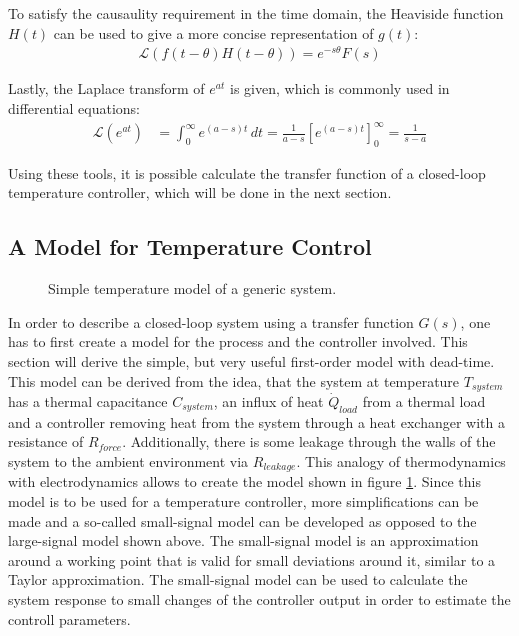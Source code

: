 To satisfy the causaulity requirement in the time domain, the Heaviside function $H(t)$ can be used to give a more concise representation of $g(t)$:
\begin{align}
    \mathscr{L}\left( f(t-\theta) H(t-\theta) \right) = e^{-s\theta} F(s) \label{eqn:laplace_causality}
\end{align}

Lastly, the Laplace transform of $e^{at}$ is given, which is commonly used in differential equations:
\begin{align}
    \mathscr{L}\left(e^{at} \right) &= \int_0^\infty e^{(a-s)t}\,dt = \frac{1}{a-s} \left[e^{(a-s)t} \right]_0^\infty = \frac{1}{s-a} \label{eqn:laplace_exponential}
\end{align}


Using these tools, it is possible calculate the transfer function of a closed-loop temperature controller, which will be done in the next section.

\clearpage
\subsection{A Model for Temperature Control}%
\label{sec:temperature_control_model}
\begin{figure}[ht]
    \centering
    \caption{Simple temperature model of a generic system.}
    \label{fig:first-order_model_room}
\end{figure}

In order to describe a closed-loop system using a transfer function $G(s)$, one has to first create a model for the process and the controller involved. This section will derive the simple, but very useful first-order model with dead-time. This model can be derived from the idea, that the system at temperature $T_{system}$ has a thermal capacitance $C_{system}$, an influx of heat $\dot Q_{load}$ from a thermal load and a controller removing heat from the system through a heat exchanger with a resistance of $R_{force}$. Additionally, there is some leakage through the walls of the system to the ambient environment via $R_{leakage}$. This analogy of thermodynamics with electrodynamics allows to create the model shown in figure \ref{fig:first-order_model_room}. Since this model is to be used for a temperature controller, more simplifications can be made and a so-called small-signal model can be developed as opposed to the large-signal model shown above. The small-signal model is an approximation around a working point that is valid for small deviations around it, similar to a Taylor approximation. The small-signal model can be used to calculate the system response to small changes of the controller output in order to estimate the controll parameters.


